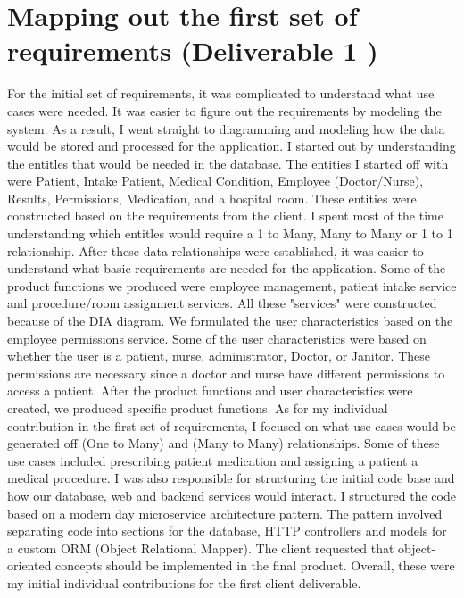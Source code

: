 \documentclass{article}
\begin{document}
\section{Mapping out the first set of requirements (Deliverable 1 )}
\begin{multicols}{2}
For the initial set of requirements, it was complicated to understand what use cases were needed. It was easier to figure out the requirements by modeling the system. As a result, I went straight to diagramming and modeling how the data would be stored and processed for the application. I started out by understanding the entitles that would be needed in the database. The entities I started off with were Patient, Intake Patient, Medical Condition, Employee (Doctor/Nurse), Results, Permissions, Medication, and a hospital room. These entities were constructed based on the requirements from the client. I spent most of the time understanding which entitles would require a 1 to Many, Many to Many or 1 to 1 relationship. After these data relationships were established, it was easier to understand what basic requirements are needed for the application. Some of the product functions we produced were employee management, patient intake service and procedure/room assignment services. All these "services" were constructed because of the DIA diagram. We formulated the user characteristics based on the employee permissions service. Some of the user characteristics were based on whether the user is a patient, nurse, administrator, Doctor, or Janitor. These permissions are necessary since a doctor and nurse have different permissions to access a patient. After the product functions and user characteristics were created, we produced specific product functions. As for my individual contribution in the first set of requirements, I focused on what use cases would be generated off (One to Many) and (Many to Many) relationships. Some of these use cases included prescribing patient medication and assigning a patient a medical procedure. I was also responsible for structuring the initial code base and how our database, web and backend services would interact. I structured the code based on a modern day microservice architecture pattern. The pattern involved separating code into sections for the database, HTTP controllers and models for a custom ORM (Object Relational Mapper). The client requested that object-oriented concepts should be implemented in the final product. Overall, these were my initial individual contributions for the first client deliverable. 


\end{multicols}
\end{document}
